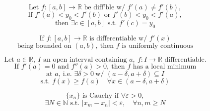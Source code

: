\documentclass[11pt]{article}
\begin{document}

\[
\text{Let } f:[a,b]\to\mathbb R \text{ be diff'ble w/ } f'(a)\ne f'(b),
\]
\[
\text{If } f'(a)<y_0<f'(b) \text{ or } f'(b)<y_0<f'(a),
\]
\[
\text{then } \exists c\in[a,b] \text{ s.t. } f'(c)=y_0
\]

\newpage


\[
\text{If } f:[a,b]\to\mathbb R \text{ is differentiable w/ } f'(x)
\]
\[
\text{being bounded on } (a,b),\ \text{then } f \text{ is uniformly continuous}
\]


\[
\text{Let } a\in\mathbb R,\ I \text{ an open interval containing } a,\ f:I\to\mathbb R \text{ differentiable.}
\]
\[
\text{If } f'(a)=0 \text{ and } f''(a)>0,\ \text{then } f \text{ has a local minimum}
\]
\[
\text{at } a,\ \text{i.e. } \exists\delta>0\ \text{w/ } (a-\delta,a+\delta)\subseteq I
\]
\[
\text{s.t. } f(x)\ge f(a)\quad \forall x\in(a-\delta,a+\delta)
\]


\[
\{x_n\} \text{ is Cauchy if } \forall\varepsilon>0,
\]
\[
\exists N\in\mathbb N \text{ s.t. } |x_m-x_n|<\varepsilon,\quad \forall n,m\ge N
\]
\end{document}
